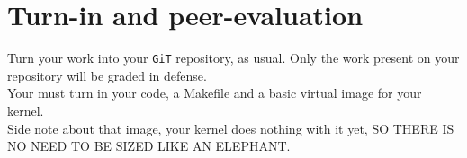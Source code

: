 \documentclass{42-en}
\begin{document}
\chapter{Turn-in and peer-evaluation}

	Turn your work into your \texttt{GiT} repository, as usual.
	Only the work present on your repository will be graded in defense.\\

	Your must turn in your code, a Makefile and a basic virtual image for your kernel.\\
	Side note about that image, your kernel does nothing with it yet,
	SO THERE IS NO NEED TO BE SIZED LIKE AN ELEPHANT.




\end{document}
